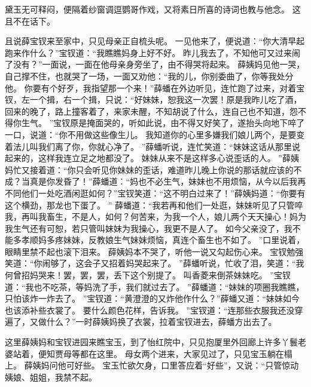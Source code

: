 黛玉无可释闷，便隔着纱窗调逗鹦哥作戏，又将素日所喜的诗词也教与他念。
这且不在话下。
\par
且说薛宝钗来至家中，只见母亲正自梳头呢。
一见他来了，便说道：“你大清早起跑来作什么？”宝钗道：“我瞧瞧妈身上好不好。
昨儿我去了，不知他可又过来闹了没有？”一面说，一面在他母亲身旁坐了，由不得哭将起来。
薛姨妈见他一哭，自己撑不住，也就哭了一场，一面又劝他：“我的儿，你别委曲了，你等我处分他。
你要有个好歹，我指望那一个来！”薛蟠在外边听见，连忙跑了过来，对着宝钗，左一个揖，右一个揖，只说：“好妹妹，恕我这一次罢！原是我昨儿吃了酒，回来的晚了，路上撞客着了，来家未醒，不知胡说了什么，连自己也不知道，怨不得你生气。
”宝钗原是掩面哭的，听如此说，由不得又好笑了，遂抬头向地下啐了一口，说道：“你不用做这些像生儿。
我知道你的心里多嫌我们娘儿两个，是要变着法儿叫我们离了你，你就心净了。
”薛蟠听说，连忙笑道：“妹妹这话从那里说起来的，这样我连立足之地都没了。
妹妹从来不是这样多心说歪话的人。
”薛姨妈忙又接着道：“你只会听见你妹妹的歪话，难道昨儿晚上你说的那话就应该的不成？当真是你发昏了！”薛蟠道：“妈也不必生气，妹妹也不用烦恼，从今以后我再不同他们一处吃酒闲逛如何？”宝钗笑道：“这不明白过来了！”薛姨妈道：“你要有这个横劲，那龙也下蛋了。
”
薛蟠道：“我若再和他们一处逛，妹妹听见了只管啐我，再叫我畜生，不是人，如何？何苦来，为我一个人，娘儿两个天天操心！妈为我生气还有可恕，若只管叫妹妹为我操心，我更不是人了。
如今父亲没了，我不能多孝顺妈多疼妹妹，反教娘生气妹妹烦恼，真连个畜生也不如了。
”口里说着，眼睛里禁不起也滚下泪来。
薛姨妈本不哭了，听他一说又勾起伤心来。
宝钗勉强笑道：“你闹够了，这会子又招着妈哭起来了。
”薛蟠听说，忙收了泪，笑道：“我何曾招妈哭来！罢，罢，罢，丢下这个别提了。
叫香菱来倒茶妹妹吃。
”宝钗道：“我也不吃茶，等妈洗了手，我们就过去了。
”薛蟠道：“妹妹的项圈我瞧瞧，只怕该炸一炸去了。
”宝钗道：“黄澄澄的又炸他作什么？”薛蟠又道：“妹妹如今也该添补些衣裳了。
要什么颜色花样，告诉我。
”宝钗道：“连那些衣服我还没穿遍了，又做什么？”一时薛姨妈换了衣裳，拉着宝钗进去，薛蟠方出去了。
\par
这里薛姨妈和宝钗进园来瞧宝玉，到了怡红院中，只见抱厦里外回廊上许多丫鬟老婆站着，便知贾母等都在这里。
母女两个进来，大家见过了，只见宝玉躺在榻上。
薛姨妈问他可好些。
宝玉忙欲欠身，口里答应着“好些”，又说：“只管惊动姨娘、姐姐，我禁不起。
